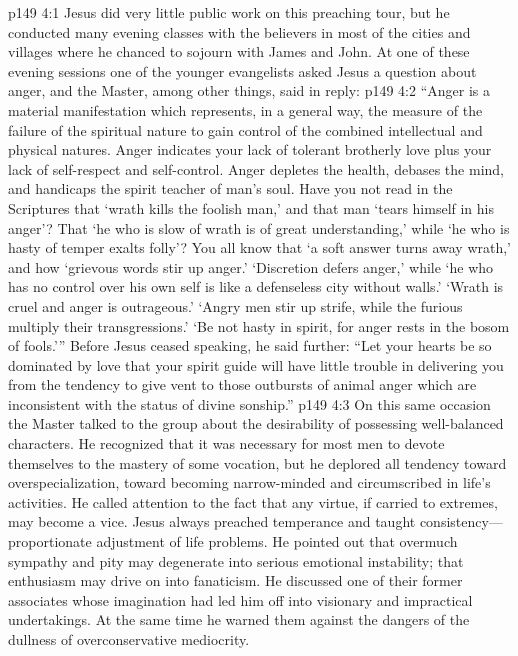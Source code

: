 \vs p149 4:1 Jesus did very little public work on this preaching tour, but he conducted many evening classes with the believers in most of the cities and villages where he chanced to sojourn with James and John. At one of these evening sessions one of the younger evangelists asked Jesus a question about anger, and the Master, among other things, said in reply:
\pc \vs p149 4:2 \textcolor{ubdarkred}{“Anger is a material manifestation which represents, in a general way, the measure of the failure of the spiritual nature to gain control of the combined intellectual and physical natures. Anger indicates your lack of tolerant brotherly love plus your lack of self\hyp{}respect and self\hyp{}control. Anger depletes the health, debases the mind, and handicaps the spirit teacher of man’s soul. Have you not read in the Scriptures that ‘wrath kills the foolish man,’ and that man ‘tears himself in his anger’? That ‘he who is slow of wrath is of great understanding,’ while ‘he who is hasty of temper exalts folly’? You all know that ‘a soft answer turns away wrath,’ and how ‘grievous words stir up anger.’ ‘Discretion defers anger,’ while ‘he who has no control over his own self is like a defenseless city without walls.’ ‘Wrath is cruel and anger is outrageous.’ ‘Angry men stir up strife, while the furious multiply their transgressions.’ ‘Be not hasty in spirit, for anger rests in the bosom of fools.’”} Before Jesus ceased speaking, he said further: \textcolor{ubdarkred}{“Let your hearts be so dominated by love that your spirit guide will have little trouble in delivering you from the tendency to give vent to those outbursts of animal anger which are inconsistent with the status of divine sonship.”}
\pc \vs p149 4:3 On this same occasion the Master talked to the group about the desirability of possessing well\hyp{}balanced characters. He recognized that it was necessary for most men to devote themselves to the mastery of some vocation, but he deplored all tendency toward overspecialization, toward becoming narrow\hyp{}minded and circumscribed in life’s activities. He called attention to the fact that any virtue, if carried to extremes, may become a vice. Jesus always preached temperance and taught consistency---proportionate adjustment of life problems. He pointed out that overmuch sympathy and pity may degenerate into serious emotional instability; that enthusiasm may drive on into fanaticism. He discussed one of their former associates whose imagination had led him off into visionary and impractical undertakings. At the same time he warned them against the dangers of the dullness of overconservative mediocrity.\plusone
